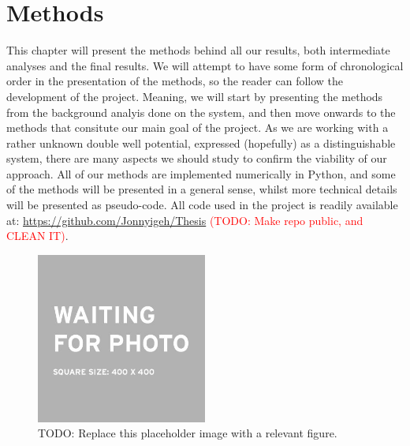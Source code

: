 \documentclass{subfiles}
\begin{document}
\chapter{Methods}
This chapter will present the methods behind all our results, both intermediate analyses and the final results. We will attempt to have some form of chronological order in the presentation of the methods, so the reader can follow the development of the project. Meaning, we will start by presenting the methods from the background analyis done on the system, and then move onwards to the methods that consitute our main goal of the project. As we are working with a rather unknown double well potential, expressed (hopefully) as a distinguishable system, there are many aspects we should study to confirm the viability of our approach. All of our methods are implemented numerically in Python, and some of the methods will be presented in a general sense, whilst more technical details will be presented as pseudo-code. All code used in the project is readily available at: \url{https://github.com/Jonnyigeh/Thesis} \textcolor{red}{(TODO: Make repo public, and CLEAN IT)}.
\begin{figure}
\centering
\includegraphics[width=0.5\textwidth]{figs/placeholder_image.jpeg}
\caption{TODO: Replace this placeholder image with a relevant figure. }
\label{fig:methods_intro}
\end{figure}




\end{document}
